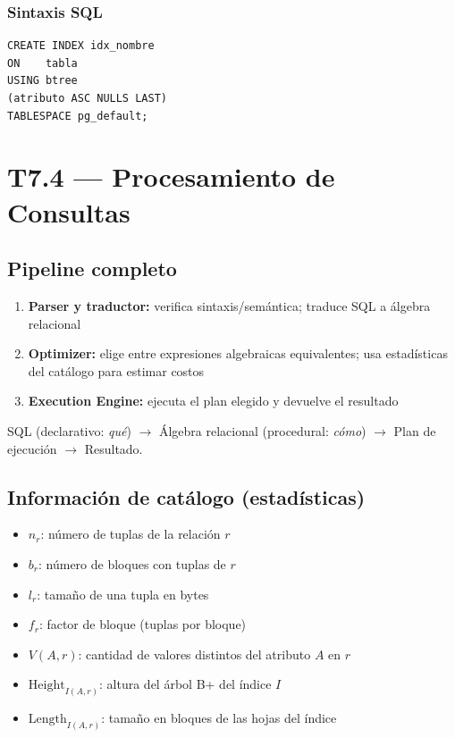 \documentclass[12pt, a4paper]{article}
\begin{document}
\subsubsection{Sintaxis SQL}
\begin{lstlisting}
CREATE INDEX idx_nombre
ON    tabla
USING btree
(atributo ASC NULLS LAST)
TABLESPACE pg_default;
\end{lstlisting}

\section{T7.4 — Procesamiento de Consultas}

\subsection{Pipeline completo}
\begin{enumerate}
  \item \textbf{Parser y traductor:} verifica sintaxis/semántica; traduce SQL a álgebra relacional
  \item \textbf{Optimizer:} elige entre expresiones algebraicas equivalentes; usa estadísticas del catálogo para estimar costos
  \item \textbf{Execution Engine:} ejecuta el plan elegido y devuelve el resultado
\end{enumerate}

SQL (declarativo: \textit{qué}) $\rightarrow$ Álgebra relacional (procedural: \textit{cómo}) $\rightarrow$ Plan de ejecución $\rightarrow$ Resultado.

\subsection{Información de catálogo (estadísticas)}
\begin{itemize}
  \item $n_r$: número de tuplas de la relación $r$
  \item $b_r$: número de bloques con tuplas de $r$
  \item $l_r$: tamaño de una tupla en bytes
  \item $f_r$: factor de bloque (tuplas por bloque)
  \item $V(A, r)$: cantidad de valores distintos del atributo $A$ en $r$
  \item $\text{Height}_{I(A,r)}$: altura del árbol B+ del índice $I$
  \item $\text{Length}_{I(A,r)}$: tamaño en bloques de las hojas del índice
\end{itemize}
\end{document}
